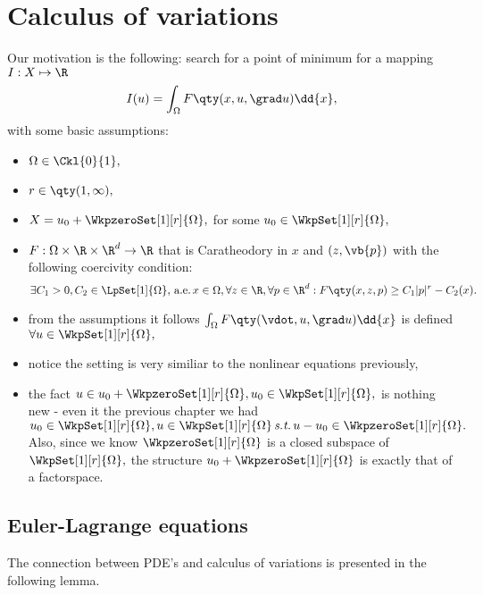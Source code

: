 
\section{Calculus of variations}
\label{sec:calculus_of_variations}

Our motivation is the following: search for a point of minimum for a mapping $I:X \mapsto \R$ 
\[
	I(u) = \int_{\Omega}F\qty(x, u, \grad u)\dd{x},
\]
with some basic assumptions:
\begin{itemize}
	\item $\Omega \in \Ckl{0}{1},$
	\item $r \in \qty(1, \infty),$
	\item $X = u_0 + \WkpzeroSet[1][r]{\Omega},$ for some $u_0 \in \WkpSet[1][r]{\Omega},$
	\item $F: \Omega \times \R \times \R^{d} \to \R$ that is Caratheodory in $x$ and $(z,\vb{p})$ with the following coercivity condition:
		\[
			\exists C_1 > 0, C_2 \in \LpSet[1]{\Omega}, \, \text{a.e.} \, x \in \Omega, \forall z \in \R, \forall p \in \R^d : F\qty(x,z,p)\geq C_1|p|^r - C_2(x).
		\]
\end{itemize}

\begin{remark}
	\begin{itemize}
		\item from the assumptions it follows $\int_{\Omega}F\qty(\vdot, u, \grad u)\dd{x}$ is defined $\forall u \in \WkpSet[1][r]{\Omega},$
		\item notice the setting is very similiar to the nonlinear equations previously,
		\item the fact $u \in u_0 + \WkpzeroSet[1][r]{\Omega}, u_0 \in \WkpSet[1][r]{\Omega},$ is nothing new - even it the previous chapter we had $u_0 \in \WkpSet[1][r]{\Omega}, u \in \WkpSet[1][r]{\Omega}\, \text{\textit{s.t.}} \, u-u_0 \in \WkpzeroSet[1][r]{\Omega}.$ Also, since we know $\WkpzeroSet[1][r]{\Omega}$ is a closed subspace of $\WkpSet[1][r]{\Omega},$ the structure $u_0 + \WkpzeroSet[1][r]{\Omega}$ is exactly that of a factorspace.

	\end{itemize}
\end{remark}

\subsection{Euler-Lagrange equations}
\label{sec:euler_lagrange}
The connection between PDE's and calculus of variations is presented in the following lemma.

